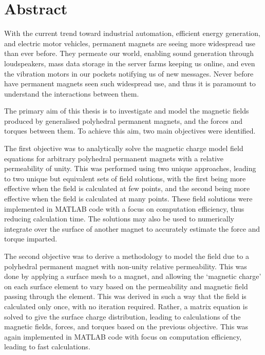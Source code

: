 \chapter*{Abstract}
With the current trend toward industrial automation, efficient energy generation, and electric motor vehicles, permanent magnets are seeing more widespread use than ever before. They permeate our world, enabling sound generation through loudspeakers, mass data storage in the server farms keeping us online, and even the vibration motors in our pockets notifying us of new messages. Never before have permanent magnets seen such widespread use, and thus it is paramount to understand the interactions between them.


The primary aim of this thesis is to investigate and model the magnetic fields produced by generalised polyhedral permanent magnets, and the forces and torques between them. To achieve this aim, two main objectives were identified.

The first objective was to analytically solve the magnetic charge model field equations for arbitrary polyhedral permanent magnets with a relative permeability of unity. This was performed using two unique approaches, leading to two unique but equivalent sets of field solutions, with the first being more effective when the field is calculated at few points, and the second being more effective when the field is calculated at many points. These field solutions were implemented in MATLAB code with a focus on computation efficiency, thus reducing calculation time. The solutions may also be used to numerically integrate over the surface of another magnet to accurately estimate the force and torque imparted.

The second objective was to derive a methodology to model the field due to a polyhedral permanent magnet with non-unity relative permeability. This was done by applying a surface mesh to a magnet, and allowing the `magnetic charge' on each surface element to vary based on the permeability and magnetic field passing through the element. This was derived in such a way that the field is calculated only once, with no iteration required. Rather, a matrix equation is solved to give the surface charge distribution, leading to calculations of the magnetic fields, forces, and torques based on the previous objective. This was again implemented in MATLAB code with focus on computation efficiency, leading to fast calculations.



